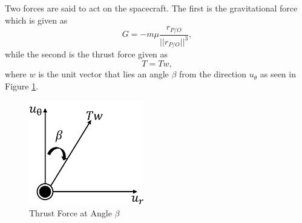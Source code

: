 \documentclass[]{article}
\begin{document}
\noindent 
Two forces are said to act on the spacecraft. The first is the gravitational force which is given as
\begin{equation} \label{grav_force}
	G = -m\mu\frac{r_{P/O}}{||r_{P/O}||^3},
\end{equation}
while the second is the thrust force given as\\
\begin{equation} \label{thrust_force}
	T = Tw,
\end{equation}
where \(w\) is the unit vector that lies an angle \(\beta\) from the direction \(u_{\theta}\) as seen in Figure \ref{fig:beta}.
\begin{figure}
	\centering
	\includegraphics[width=50mm,scale=0.5]{beta.png}
	\caption{Thrust Force at Angle \(\beta\)}
	\label{fig:beta}
\end{figure}
\end{document}

